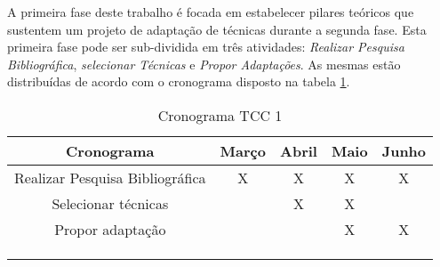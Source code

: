 A primeira fase deste trabalho é focada em estabelecer pilares teóricos que sustentem um projeto de adaptação de técnicas durante a segunda fase. Esta primeira fase pode ser sub-dividida em três atividades: \textit{Realizar Pesquisa Bibliográfica}, \textit{selecionar Técnicas} e \textit{Propor Adaptações}. As mesmas estão distribuídas de acordo com o cronograma disposto na tabela \ref{tab:cronograma}.

\begin{table}[http]
	\centering
	\caption{Cronograma TCC 1}
	\label{tab:cronograma}
	\begin{tabular}{ccccc}
		\hline
		\multicolumn{1}{|c|}{\textbf{Cronograma}}             & \multicolumn{1}{c|}{\textbf{Março}} & \multicolumn{1}{c|}{\textbf{Abril}} & \multicolumn{1}{c|}{\textbf{Maio}} & \multicolumn{1}{c|}{\textbf{Junho}} \\ \hline
		\multicolumn{1}{|c|}{Realizar Pesquisa Bibliográfica} & \multicolumn{1}{c|}{X}              & \multicolumn{1}{c|}{X}              & \multicolumn{1}{c|}{X}             & \multicolumn{1}{c|}{X}              \\ \hline
		\multicolumn{1}{|c|}{Selecionar técnicas}             & \multicolumn{1}{c|}{}               & \multicolumn{1}{c|}{X}              & \multicolumn{1}{c|}{X}             & \multicolumn{1}{c|}{}               \\ \hline
		\multicolumn{1}{|c|}{Propor adaptação}                & \multicolumn{1}{c|}{}               & \multicolumn{1}{c|}{}               & \multicolumn{1}{c|}{X}             & \multicolumn{1}{c|}{X}              \\ \hline
		\multicolumn{1}{l}{}                                  & \multicolumn{1}{l}{}                & \multicolumn{1}{l}{}                & \multicolumn{1}{l}{}               & \multicolumn{1}{l}{}                \\
		\multicolumn{1}{l}{}                                  & \multicolumn{1}{l}{}                & \multicolumn{1}{l}{}                & \multicolumn{1}{l}{}               & \multicolumn{1}{l}{}                \\
		\multicolumn{1}{l}{}                                  & \multicolumn{1}{l}{}                & \multicolumn{1}{l}{}                & \multicolumn{1}{l}{}               & \multicolumn{1}{l}{}               
	\end{tabular}
\end{table}

